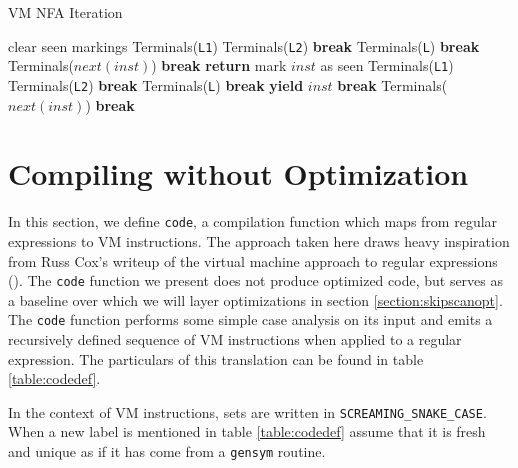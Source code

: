 \begin{algorithm}
\caption{VM NFA Iteration} \label{algo:nfaiter}
\begin{algorithmic}
  \State clear seen markings
      \State Terminals({\tt L1})
      \State Terminals({\tt L2})
      \State \textbf{break}
    \EndCase
      \State Terminals({\tt L})
      \State \textbf{break}
    \EndCase
     \EndCase
     \EndCase
      \State Terminals($next(inst)$)
      \State \textbf{break}
    \EndCase
  \EndSwitch
\EndProcedure
{}
    \State \textbf{return}
  \EndIf
  \State mark $inst$ as seen
      \State Terminals({\tt L1})
      \State Terminals({\tt L2})
      \State \textbf{break}
    \EndCase
      \State Terminals({\tt L})
      \State \textbf{break}
    \EndCase
     \EndCase
      \State \textbf{yield} $inst$
      \State \textbf{break}
    \EndCase
      \State Terminals($next(inst)$)
      \State \textbf{break}
    \EndCase
  \EndSwitch
\EndProcedure
\end{algorithmic}
\end{algorithm}

\section{Compiling without Optimization}
\label{section:compilation}

In this section, we define \verb'code', a compilation function which maps
from regular expressions to VM instructions. The approach taken here
draws heavy inspiration from Russ Cox's writeup of the virtual machine
approach to regular expressions (\cite{CoxVirtualMachineApproach}).
The \verb'code' function we present does not produce optimized code,
but serves as a baseline over which we will layer optimizations
in section \ref{section:skipscanopt}.
The \verb'code' function performs some simple case analysis on its
input and emits a recursively defined sequence of VM instructions when applied
to a regular expression.
The particulars of this translation can
be found in table \ref{table:codedef}.

In the context of VM instructions, sets are written in
\texttt{SCREAMING\allowbreak\_SNAKE\allowbreak\_CASE}.
When a new label is mentioned in table
\ref{table:codedef} assume that it is fresh and unique as if it has
come from a \verb'gensym' routine.

